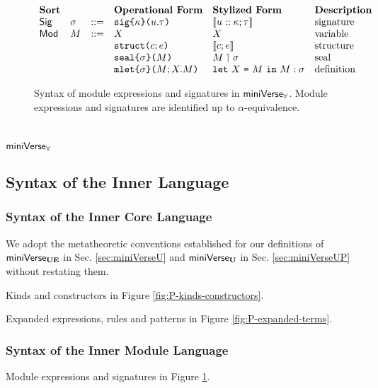 \begin{figure}[p] 
$\begin{array}{lllllll}
\textbf{Sort} & & & \textbf{Operational Form} & \textbf{Stylized Form} & \textbf{Description}\\
\mathsf{Sig} & \sigma & ::= & \texttt{sig}\texttt{\{}\kappa\texttt{\}(}u.\tau\texttt{)} & \llbracket u :: \kappa; \tau \rrbracket & \text{signature}\\
\mathsf{Mod} & M & ::= & X & X & \text{variable}\\
&&& \texttt{struct}\texttt{(}c; e\texttt{)} & \llbracket c; e \rrbracket & \text{structure}\\
&&& \texttt{seal}\texttt{\{}\sigma\texttt{\}(}M\texttt{)} & M \upharpoonleft \sigma & \text{seal}\\
&&& \texttt{mlet}\texttt{\{}\sigma\texttt{\}(}M; X.M\texttt{)} & \texttt{let}~X~\texttt{=}~M~\texttt{in}~M : \sigma & \text{definition}
\end{array}$
\caption[Syntax of module expressions and signatures in $\miniVerseParam$]{Syntax of module expressions and signatures in $\miniVerseParam$. Module expressions and signatures are identified up to $\alpha$-equivalence.}
\label{fig:P-modules-signatures}
\end{figure}

\section{\texorpdfstring{$\miniVerseParam$}{miniVerseForall}}\label{sec:miniVerseP}
\subsection{Syntax of the Inner Language}


\subsubsection{Syntax of the Inner Core Language}
We adopt the metatheoretic conventions established for our definitions of $\mathsf{miniVerse}_\textbf{UE}$ in Sec. \ref{sec:miniVerseU} and $\mathsf{miniVerse}_\textbf{U}$ in Sec. \ref{sec:miniVerseUP} without restating them. 

Kinds and constructors in Figure \ref{fig:P-kinds-constructors}.

Expanded expressions, rules and patterns in Figure \ref{fig:P-expanded-terms}.

\subsubsection{Syntax of the Inner Module Language}
Module expressions and signatures in Figure \ref{fig:P-modules-signatures}.

